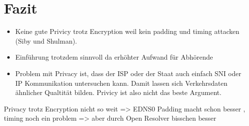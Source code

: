 \chapter{Fazit}



\begin{draft}
    \begin{itemize}
        \item Keine gute Privicy trotz Encryption weil kein padding und timing attacken (Siby und Shulman). 
        \item Einführung trotzdem sinnvoll da erhöhter Aufwand für Abhörende 
        \item Problem mit Privacy ist, dass der ISP oder der Staat auch einfach SNI oder IP Kommunikation untersuchen kann. Damit lassen sich Verkehrsdaten ähnlicher Qualtität bilden. Privicy ist also nicht das beste Argument.
    \end{itemize}

    Privacy trotz Encryption nicht so weit \cite{Shulman2014} \cite{Siby2018} => EDNS0 Padding macht schon besser \cite{rfc7830}, timing noch ein problem => aber durch Open Resolver bisschen besser\cite{Shulman2014}
\end{draft}